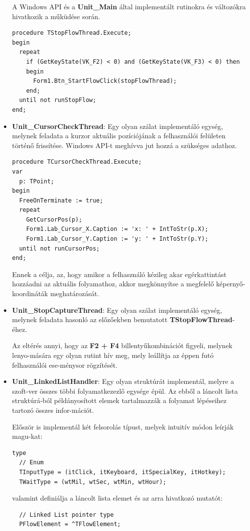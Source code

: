 \begin{itemize}
{A Windows API és a \textbf{Unit\_Main} által implementált rutinokra és változókra hivatkozik a műküdése során.
		\begin{lstlisting}
procedure TStopFlowThread.Execute;
begin
  repeat
    if (GetKeyState(VK_F2) < 0) and (GetKeyState(VK_F3) < 0) then
    begin
      Form1.Btn_StartFlowClick(stopFlowThread);
    end;
  until not runStopFlow;
end;
		\end{lstlisting}
	}
	\item{
		\textbf{Unit\_CursorCheckThread}: Egy olyan szálat implementáló egység, melynek feladata a kurzor aktuális pozíciójának a felhasználói felületen történő frissítése. Windows API-t meghívva jut hozzá a szükséges adathoz.
		\begin{lstlisting}
procedure TCursorCheckThread.Execute;
var
  p: TPoint;
begin
  FreeOnTerminate := true;
  repeat
    GetCursorPos(p);
    Form1.Lab_Cursor_X.Caption := 'x: ' + IntToStr(p.X);
    Form1.Lab_Cursor_Y.Caption := 'y: ' + IntToStr(p.Y);
  until not runCursorPos;
end;
		\end{lstlisting}
		Ennek a célja, az, hogy amikor a felhasználó kézileg akar egérkattintást hozzáadni az aktuális folyamathoz, akkor megkönnyítse a megfelelő képernyő-koordináták meghatározását.
	}
	\item{
		\textbf{Unit\_StopCaptureThread}: Egy olyan szálat implementáló egység, melynek feladata hasonló az előzőekben bemutatott \textbf{TStopFlowThread}-éhez.

Az eltérés annyi, hogy az \textbf{F2 + F4} billentyűkombinációt figyeli, melynek lenyo\hyp{}mására egy olyan rutint hív meg, mely leállítja az éppen futó felhasználói ese\hyp{}ménysor rögzítését.
	}
	\item{
		\textbf{Unit\_LinkedListHandler}: Egy olyan struktúrát implementál, melyre a szoft\hyp{}ver összes többi folyamatkezezlő egysége épül. Az ebből a láncolt lista struktúrá\hyp{}ból példányosított elemek tartalmazzák a folyamat lépéseihez tartozó összes infor\hyp{}mációt.

	Először is implementál két felsorolás típust, melyek intuitív módon leírják magu\hyp{}kat:
	\begin{lstlisting}
type
  // Enum
  TInputType = (itClick, itKeyboard, itSpecialKey, itHotkey);
  TWaitType = (wtMil, wtSec, wtMin, wtHour);
	\end{lstlisting}

	valamint definiálja a láncolt lista elemet és az arra hivatkozó mutatót:
	\begin{lstlisting}
  // Linked List pointer type
  PFlowElement = ^TFlowElement;


\end{lstlisting}}
\end{itemize}
